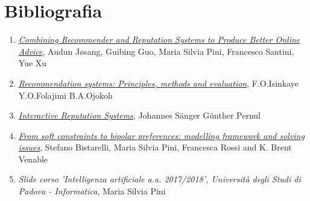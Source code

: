 \documentclass{report}
\begin{document}
	
	\hypertarget{header-n287}{%
		\section{Bibliografia}\label{header-n287}}
	
	\begin{enumerate}
		\item
		\href{https://www.researchgate.net/publication/262187804_Combining_Recommender_and_Reputation_Systems_to_Produce_Better_Online_Advice}{\textit{Combining Recommender and Reputation Systems to Produce Better Online Advice}}, Audun Jøsang, Guibing Guo, Maria Silvia Pini, Francesco Santini, Yue Xu
		\item \href{https://www.sciencedirect.com/science/article/pii/S1110866515000341}{\textit{Recommendation systems: Principles, methods and evaluation}}, F.O.Isinkaye Y.O.Folajimi B.A.Ojokoh
		\item 
		\href{https://link.springer.com/article/10.1007/s12599-017-0493-1}{\textit{Interactive Reputation Systems}}, Johannes Sänger Günther Pernul
		\item 
		\href{http://www.math.unipd.it/~frossi/jbip8-jetai.pdf}{\textit{From soft constraints to bipolar preferences: modelling framework and solving issues}}, Stefano Bistarelli, Maria Silvia Pini, Francesca Rossi and K. Brent Venable
		\item
		\textit{Slide corso 'Intelligenza artificiale a.a. 2017/2018', Università degli Studi di Padova - Informatica}, Maria Silvia Pini
	\end{enumerate}
	
\end{document}
